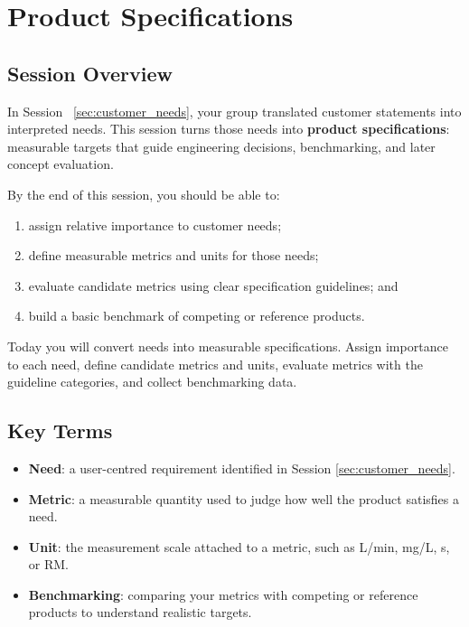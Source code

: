 \chapter{Product Specifications}

\section{Session Overview}

In Session~ \ref{sec:customer_needs}, your group translated customer statements into interpreted needs. This session turns those needs into \textbf{product specifications}: measurable targets that guide engineering decisions, benchmarking, and later concept evaluation.

By the end of this session, you should be able to:
\begin{enumerate}
    \item assign relative importance to customer needs;
    \item define measurable metrics and units for those needs;
    \item evaluate candidate metrics using clear specification guidelines; and
    \item build a basic benchmark of competing or reference products.
\end{enumerate}

\begin{tcolorbox}[title=Goal]
Today you will convert needs into measurable specifications. Assign importance to each need, define candidate metrics and units, evaluate metrics with the guideline categories, and collect benchmarking data.
\end{tcolorbox}

\section{Key Terms}

\begin{itemize}
    \item \textbf{Need}: a user-centred requirement identified in Session \ref{sec:customer_needs}.
    \item \textbf{Metric}: a measurable quantity used to judge how well the product satisfies a need.
    \item \textbf{Unit}: the measurement scale attached to a metric, such as L/min, mg/L, s, or RM.
    \item \textbf{Benchmarking}: comparing your metrics with competing or reference products to understand realistic targets.
\end{itemize}

